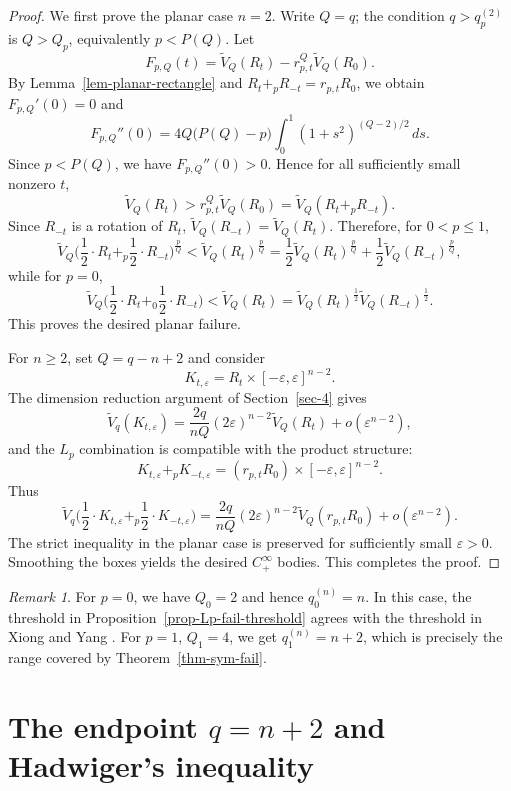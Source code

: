 \documentclass[12pt,leqno]{amsart}
\theoremstyle{plain} \newtheorem{thm}{Theorem}[section]
\theoremstyle{plain} \newtheorem{prop}[thm]{Proposition}
\theoremstyle{plain} \newtheorem{prob}[thm]{Problem}
\theoremstyle{definition} \newtheorem{defi}[thm]{Definition}
\theoremstyle{plain} \newtheorem{cor}[thm]{Corollary}
\theoremstyle{plain} \newtheorem{lem}[thm]{Lemma}
\theoremstyle{plain} \newtheorem{eg}{Example}[section]
\theoremstyle{remark} \newtheorem{rmk}[thm]{Remark}
\theoremstyle{plain} \newtheorem{conj}{Conjecture}
\numberwithin{equation}{section}
\newcommand{\tV}{\widetilde V}
\begin{document}
\begin{proof}
We first prove the planar case \(n=2\). Write \(Q=q\); the condition
\(q>q_p^{(2)}\) is \(Q>Q_p\), equivalently \(p<P(Q)\). Let
\[
F_{p,Q}(t)=\tV_Q(R_t)-r_{p,t}^Q\tV_Q(R_0).
\]
By Lemma~\ref{lem-planar-rectangle} and \(R_t+_pR_{-t}=r_{p,t}R_0\), we obtain $F_{p,Q}'(0)=0$ and
\[
F_{p,Q}''(0)=4Q\bigl(P(Q)-p\bigr)
\int_0^1(1+s^2)^{(Q-2)/2}\,ds.
\]
Since \(p<P(Q)\), we have \(F_{p,Q}''(0)>0\). Hence for all sufficiently small
nonzero \(t\),
\[
\tV_Q(R_t)>r_{p,t}^Q\tV_Q(R_0)=\tV_Q(R_t+_pR_{-t}).
\]
Since \(R_{-t}\) is a rotation of \(R_t\),
\(\tV_Q(R_{-t})=\tV_Q(R_t)\). Therefore, for \(0<p\le1\),
\[
\tV_Q\bigl(\frac{1}{2}\cdot R_t+_p\frac{1}{2}\cdot R_{-t}\bigr)^{\frac{p}{Q}}
<
\tV_Q(R_t)^{\frac{p}{Q}}
=
\frac12\tV_Q(R_t)^{\frac{p}{Q}}
+\frac12\tV_Q(R_{-t})^{\frac{p}{Q}},
\]
while for \(p=0\),
\[
\tV_Q\bigl(\frac{1}{2}\cdot R_t+_0\frac{1}{2}\cdot R_{-t}\bigr)
<
\tV_Q(R_t)
=
\tV_Q(R_t)^{\frac12}\tV_Q(R_{-t})^{\frac12}.
\]
This proves the desired planar failure.

For \(n\ge2\), set \(Q=q-n+2\) and consider
\[
K_{t,\varepsilon}=R_t\times[-\varepsilon,\varepsilon]^{n-2}.
\]
The dimension reduction argument of Section~\ref{sec-4} gives
\[
\tV_q(K_{t,\varepsilon})
=
\frac{2q}{nQ}(2\varepsilon)^{n-2}\tV_Q(R_t)
+o(\varepsilon^{n-2}),
\]
and the \(L_p\) combination is compatible with the product structure:
\[
K_{t,\varepsilon}+_pK_{-t,\varepsilon}
=
(r_{p,t}R_0)\times[-\varepsilon,\varepsilon]^{n-2}.
\]
Thus
\[
\tV_q\bigl(\frac{1}{2}\cdot K_{t,\varepsilon}+_p\frac{1}{2}\cdot K_{-t,\varepsilon}\bigr)
=
\frac{2q}{nQ}(2\varepsilon)^{n-2}\tV_Q(r_{p,t}R_0)
+o(\varepsilon^{n-2}).
\]
The strict inequality in the planar case is preserved for sufficiently small
\(\varepsilon>0\). Smoothing the boxes yields the desired \(C^\infty_+\) bodies.
This completes the proof.
\end{proof}

\begin{rmk}
For \(p=0\), we have \(Q_0=2\) and hence \(q_0^{(n)}=n\). In this case, the threshold in Proposition~\ref{prop-Lp-fail-threshold} agrees with the threshold in Xiong and Yang \cite[Theorem 1.4]{XiongY26}.
For \(p=1\), \(Q_1=4\), we get \(q_1^{(n)}=n+2\), which is precisely the range covered by Theorem~\ref{thm-sym-fail}.
\end{rmk}



\section{The endpoint $q=n+2$ and Hadwiger's inequality}\label{sec-5}
\end{document}
